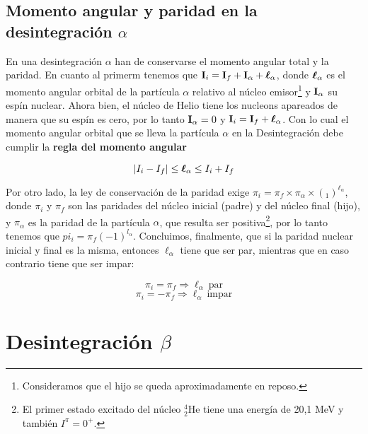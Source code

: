 
\subsection{Momento angular y paridad en la desintegración $\alpha$}

En una desintegración $\alpha$ han de conservarse el momento angular total y la paridad. En cuanto al primerm tenemos que $\mathbf{I}_i = \mathbf{I}_f + \mathbf{I}_\alpha + \boldsymbol{\ell}_\alpha$, donde $\boldsymbol{\ell}_\alpha$ es el momento angular orbital de la partícula $\alpha$ relativo al núcleo emisor\footnote{Consideramos que el hijo se queda aproximadamente en reposo.} y $\mathbf{I}_\alpha$ su espín nuclear. Ahora bien, el núcleo de Helio tiene los nucleons apareados de manera que su espín es cero, por lo tanto $\mathbf{I}_\alpha  =0$ y $\mathbf{I}_i = \mathbf{I}_f + \boldsymbol{\ell}_\alpha$. Con lo cual el momento angular orbital que se lleva la partícula $\alpha$ en la Desintegración debe cumplir la \textbf{regla del momento angular}

\begin{mybox}
\begin{equation}
    |I_i-I_f|\leq \boldsymbol{\ell}_\alpha \leq I_i + I_f
\end{equation}
\end{mybox}
Por otro lado, la ley de conservación de la paridad exige $\pi_i=\pi_f \times \pi_\alpha \times (_1)^{\ell_\alpha}$, donde $\pi_i$ y $\pi_f$ son las paridades del núcleo inicial (padre) y del núcleo final (hijo), y $\pi_\alpha$ es la paridad de la partícula $\alpha$, que resulta ser positiva\footnote{El primer estado excitado del núcleo $^4_2$He tiene una energía de 20,1 MeV y también $I^\pi = 0^+$.}, por lo tanto tenemos que $pi_i = \pi_f (-1)^{l_\alpha}$. Concluimos, finalmente, que si la paridad nuclear inicial y final es la misma, entonces $\ell_\alpha$ tiene que ser par, mientras que en caso contrario tiene que ser impar:

\begin{equation}
    \pi_i = \pi_f \Longrightarrow \ell_\alpha \ \text{par}
\end{equation}
\begin{equation*}
    \pi_i = - \pi_f \Longrightarrow \ell_\alpha \ \text{impar}
\end{equation*}



\section{Desintegración $\beta$}

